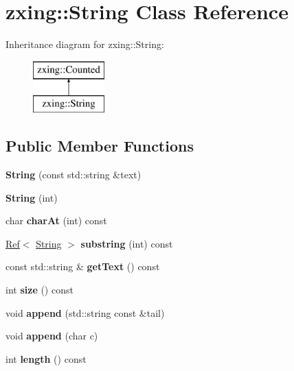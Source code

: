 \hypertarget{classzxing_1_1_string}{}\section{zxing\+:\+:String Class Reference}
\label{classzxing_1_1_string}
Inheritance diagram for zxing\+:\+:String\+:\begin{figure}[H]
\begin{center}
\leavevmode
\includegraphics[height=2.000000cm]{classzxing_1_1_string}
\end{center}
\end{figure}
\subsection*{Public Member Functions}
\begin{DoxyCompactItemize}
\item 
\mbox{\label{classzxing_1_1_string_aee7435ca30da51d2f7aae268593dc5cc}} 
{\bfseries String} (const std\+::string \&text)
\item 
\mbox{\label{classzxing_1_1_string_aa587f4b9ed71e429763163a01cb237d4}} 
{\bfseries String} (int)
\item 
\mbox{\label{classzxing_1_1_string_aa85548f0fbe22238700374fbd069e16b}} 
char {\bfseries char\+At} (int) const
\item 
\mbox{\label{classzxing_1_1_string_a4d7899722ce3b8ebe9241fd70969e7c0}} 
\mbox{\hyperlink{classzxing_1_1_ref}{Ref}}$<$ \mbox{\hyperlink{classzxing_1_1_string}{String}} $>$ {\bfseries substring} (int) const
\item 
\mbox{\label{classzxing_1_1_string_a483dd83831196ce38a417b6c1d24484e}} 
const std\+::string \& {\bfseries get\+Text} () const
\item 
\mbox{\label{classzxing_1_1_string_a93b795a3631cdf45e813d2d30782ca78}} 
int {\bfseries size} () const
\item 
\mbox{\label{classzxing_1_1_string_a43acc4ba18cedd0b04f46becd24ccd29}} 
void {\bfseries append} (std\+::string const \&tail)
\item 
\mbox{\label{classzxing_1_1_string_a1d8b64a6b87f604f50458d4f461afc8b}} 
void {\bfseries append} (char c)
\item 
\mbox{\label{classzxing_1_1_string_a79366b9ecdbde9701a9acfe0009a5ded}} 
int {\bfseries length} () const
\end{DoxyCompactItemize}
